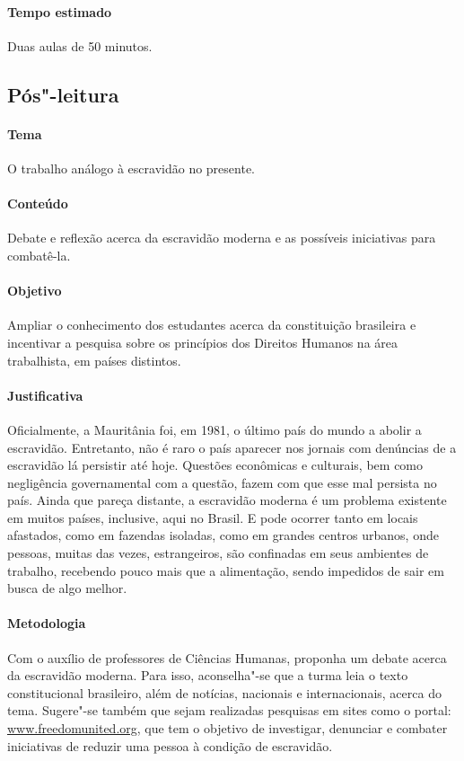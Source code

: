 \documentclass[12pt]{extarticle}
\begin{document}
\paragraph{Tempo estimado} Duas aulas de 50 minutos.

\subsection{Pós"-leitura}

\paragraph{Tema} O trabalho análogo à escravidão no presente.

\paragraph{Conteúdo} Debate e reflexão acerca da escravidão
moderna e as possíveis iniciativas para combatê-la.

\paragraph{Objetivo} Ampliar o conhecimento dos estudantes
acerca da constituição brasileira e incentivar a pesquisa
sobre os princípios dos Direitos Humanos na área trabalhista, em países distintos.

\paragraph{Justificativa} Oficialmente, a Mauritânia foi, em 1981, o último país do
mundo a abolir a escravidão. Entretanto, não é raro o país aparecer nos
jornais com denúncias de a escravidão lá persistir até hoje. Questões
econômicas e culturais, bem como negligência governamental com a
questão, fazem com que esse mal persista no país. Ainda que pareça
distante, a escravidão moderna é um problema existente em muitos países,
inclusive, aqui no Brasil. E pode ocorrer tanto em locais afastados,
como em fazendas isoladas, como em grandes centros urbanos, onde
pessoas, muitas das vezes, estrangeiros, são confinadas em seus
ambientes de trabalho, recebendo pouco mais que a
alimentação, sendo impedidos de sair em busca de algo melhor. 

\paragraph{Metodologia} Com o auxílio de professores de Ciências Humanas, 
proponha um debate acerca da escravidão moderna.
Para isso, aconselha"-se que a turma leia o texto constitucional
brasileiro, além de notícias, nacionais e internacionais, acerca do tema.
Sugere"-se também que sejam realizadas pesquisas em sites como
o portal:
\href{https://www.freedomunited.org/}{www.freedomunited.org}, que tem o objetivo de investigar, 
denunciar e combater iniciativas de reduzir uma pessoa à condição de escravidão.
\end{document}
